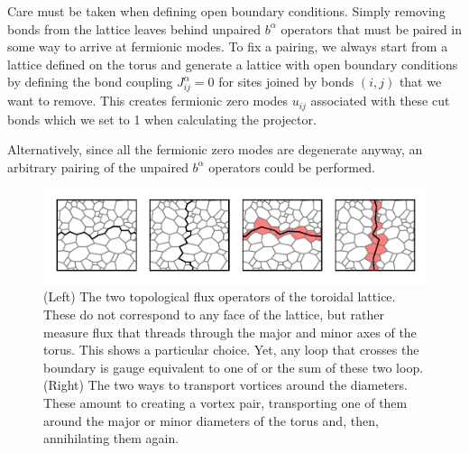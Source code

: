Care must be taken when defining open boundary conditions. Simply removing bonds from the lattice leaves behind unpaired \(b^\alpha\) operators that must be paired in some way to arrive at fermionic modes. To fix a pairing, we always start from a lattice defined on the torus and generate a lattice with open boundary conditions by defining the bond coupling \(J^{\alpha}_{ij} = 0\) for sites joined by bonds \((i,j)\) that we want to remove. This creates fermionic zero modes \(u_{ij}\) associated with these cut bonds which we set to 1 when calculating the projector.

Alternatively, since all the fermionic zero modes are degenerate anyway, an arbitrary pairing of the unpaired \(b^\alpha\) operators could be performed.

\hypertarget{fig:loops_and_dual_loops}{%
\begin{figure}
\centering
\includegraphics[width=1\textwidth,height=\textheight]{figure_code/amk_chapter/loops_and_dual_loops/loops_and_dual_loops}
\caption[{Topological Loops and Dual Loops}]{(Left) The two topological flux operators of the toroidal lattice. These do not correspond to any face of the lattice, but rather measure flux that threads through the major and minor axes of the torus. This shows a particular choice. Yet, any loop that crosses the boundary is gauge equivalent to one of or the sum of these two loop. (Right) The two ways to transport vortices around the diameters. These amount to creating a vortex pair, transporting one of them around the major or minor diameters of the torus and, then, annihilating them again.}
\label{fig:loops_and_dual_loops}
\end{figure}
}

\begin{lstlisting}[language=Python]
\end{lstlisting}
